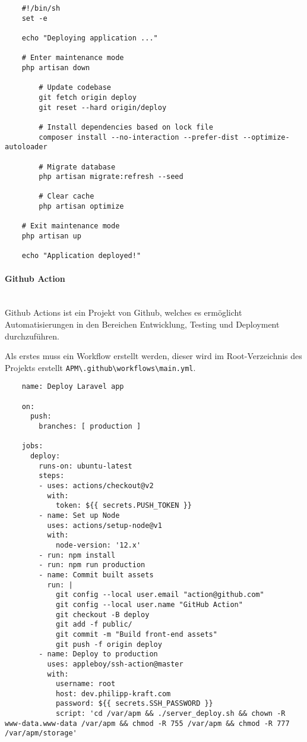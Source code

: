 \begin{listing}[H]
  \begin{verbatim}
    #!/bin/sh
    set -e
    
    echo "Deploying application ..."
    
    # Enter maintenance mode
    php artisan down
        
        # Update codebase
        git fetch origin deploy
        git reset --hard origin/deploy
    
        # Install dependencies based on lock file
        composer install --no-interaction --prefer-dist --optimize-autoloader
    
        # Migrate database
        php artisan migrate:refresh --seed
    
        # Clear cache
        php artisan optimize
    
    # Exit maintenance mode
    php artisan up
    
    echo "Application deployed!"
  \end{verbatim}
  \caption{serverdeploy.sh}
\end{listing}


\paragraph{Github Action}\mbox{}\\
Github Actions ist ein Projekt von Github, welches es ermöglicht Automatisierungen in den Bereichen Entwicklung, Testing und Deployment durchzuführen.

Als erstes muss ein Workflow erstellt werden, dieser wird im Root-Verzeichnis des Projekts erstellt \verb|APM\.github\workflows\main.yml|.

\begin{listing}[H]
  \begin{verbatim}
    name: Deploy Laravel app

    on:
      push:
        branches: [ production ]
    
    jobs:
      deploy:
        runs-on: ubuntu-latest
        steps:
        - uses: actions/checkout@v2
          with:
            token: ${{ secrets.PUSH_TOKEN }}
        - name: Set up Node
          uses: actions/setup-node@v1
          with:
            node-version: '12.x'
        - run: npm install
        - run: npm run production
        - name: Commit built assets
          run: |
            git config --local user.email "action@github.com"
            git config --local user.name "GitHub Action"
            git checkout -B deploy
            git add -f public/
            git commit -m "Build front-end assets"
            git push -f origin deploy
        - name: Deploy to production
          uses: appleboy/ssh-action@master
          with:
            username: root
            host: dev.philipp-kraft.com
            password: ${{ secrets.SSH_PASSWORD }}
            script: 'cd /var/apm && ./server_deploy.sh && chown -R www-data.www-data /var/apm && chmod -R 755 /var/apm && chmod -R 777 /var/apm/storage' 
  \end{verbatim}
  \caption{main.yml}
\end{listing} 

